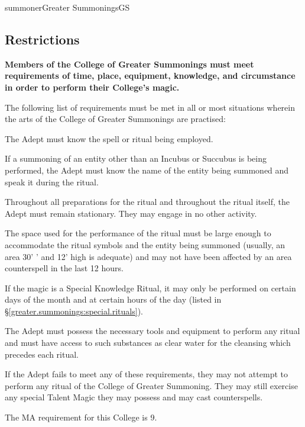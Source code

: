 \begin{college}[1.0]{summoner}{Greater Summonings}{GS}
\subsection{Restrictions}

\textbf{Members of the College of Greater Summonings must meet
requirements of time, place, equipment, knowledge, and circumstance in
order to perform their College's magic.}

The following list of requirements must be met in all or most
situations wherein the arts of the College of Greater Summonings are
practised:

\begin{Enumerate}
\item
The Adept must know the spell or ritual being employed.

\item
If a summoning of an entity other than an Incubus or Succubus is being
performed, the Adept must know the name of the entity being summoned
and speak it during the ritual.

\item
Throughout all preparations for the ritual and throughout the ritual
itself, the Adept must remain stationary.  They may engage in no other
activity.

\item
The space used for the performance of the ritual must be large enough
to accommodate the ritual symbols and the entity being summoned
(usually, an area 30' ' and 12' high is adequate) and may not have
been affected by an area counterspell in the last 12 hours.

\item
If the magic is a Special Knowledge Ritual, it may only be performed
on certain days of the month and at certain hours of the day (listed
in \S\ref{greater.summonings:special.rituals}).

\item
The Adept must possess the necessary tools and equipment to perform
any ritual and must have access to such substances as clear water for
the cleansing which precedes each ritual.
\end{Enumerate}

If the Adept fails to meet any of these requirements, they may not
attempt to perform any ritual of the College of Greater Summoning.
They may still exercise any special Talent Magic they may possess and
may cast counterspells.

The MA requirement for this College is 9.


\end{college}
